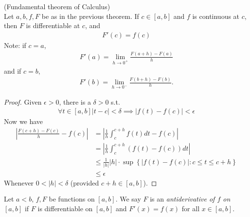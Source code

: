 \documentclass[a4paper]{article}
\begin{document}
\begin{thm} (Fundamental theorem of Calculus)\\
Let $a,b,f,F$ be as in the previous theorem. If $c\in\left[a,b\right]$ and $f$ is continuous at $c$, then $F$ is differentiable at $c$, and
\begin{equation*}
\begin{aligned}
F'\left(c\right) = f\left(c\right)
\end{aligned}
\end{equation*}
Note: if $c=a$,
\begin{equation*}
\begin{aligned}
F'\left(a\right) = \lim_{h\to 0^+} \frac{F\left(a+h\right) - F\left(a\right)}{h}
\end{aligned}
\end{equation*}
and if $c=b$,
\begin{equation*}
\begin{aligned}
F'\left(b\right) = \lim_{h\to 0^-} \frac{F\left(b+h\right) - F\left(b\right)}{h}.
\end{aligned}
\end{equation*}
\begin{proof}
Given $\epsilon>0$, there is a $\delta>0$ s.t. 
\begin{equation*}
\begin{aligned}
\forall t\in\left[a,b\right] |t-c|<\delta \implies |f\left(t\right) - f\left(c\right)| < \epsilon
\end{aligned}
\end{equation*}
Now we have
\begin{equation*}
\begin{aligned}
|\frac{F\left(c+h\right)-F\left(c\right)}{h}-f\left(c\right)| &= |\frac{1}{h}\int_c^{c+h} f\left(t\right)dt-f\left(c\right)|\\
&=|\frac{1}{h} \int_c^{c+h} \left(f\left(t\right)-f\left(c\right)\right) dt|\\
&\leq \frac{1}{|h|}|h| \cdot \sup \left\{|f\left(t\right)-f\left(c\right)|: c \leq t \leq c+h\right\}\\
&\leq \epsilon
\end{aligned}
\end{equation*}
Whenever $0<|h|<\delta$ (provided $c+h\in\left[a,b\right]$).
\end{proof}
\end{thm}

Let $a<b$, $f,F$ be functions on $\left[a,b\right]$. We say $F$ is an \emph{antiderivative of $f$ on $\left[a,b\right]$} if $F$ is differentiable on $\left[a,b\right]$ and $F'\left(x\right) = f\left(x\right)$ for all $x\in\left[a,b\right]$.
\end{document}
